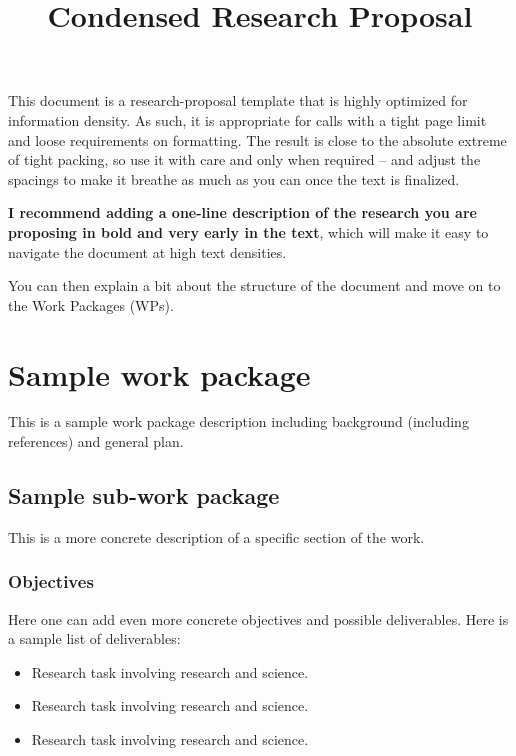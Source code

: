 \documentclass[10pt,a4paper]{article}
\title{Condensed Research Proposal}
\author{}
\date{}
\begin{document}
\pagestyle{fancy}

\maketitle
\thispagestyle{fancy}





This document is a research-proposal template that is highly optimized for information density.
As such, it is appropriate for calls with a tight page limit and loose requirements on formatting. 
The result is close to the absolute extreme of tight packing, so use it with care and only when required -- and adjust the spacings to make it breathe as much as you can once the text is finalized.


\textbf{I recommend adding a one-line description of the research you are proposing in bold and very early in the text}, which will make it easy to navigate the document at high text densities.

You can then explain a bit about the structure of the document and move on to the Work Packages (WPs).










\section{Sample work package}
%
This is a sample work package description including background (including references\cite{krausz2009}) and general plan.
{\color{gray} \lipsum[1]}




\subsection{Sample sub-work package}
This is a more concrete description of a specific section of the work.
{\color{gray} \lipsum[2]}


\subsubsection{Objectives}
Here one can add even more concrete objectives and possible deliverables. 
Here is a sample list of deliverables:

\begin{itemize}

\item 
Research task involving research and science.

\item 
Research task involving research and science.

\item 
Research task involving research and science.

\end{itemize}
\end{document}
